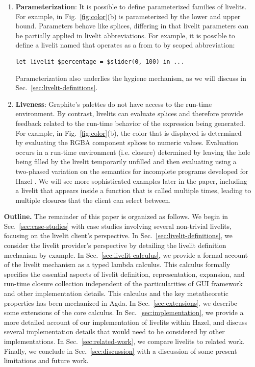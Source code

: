 \begin{enumerate}
  \item \textbf{Parameterization}: It is possible to define parameterized families of livelits.
  For example,  in Fig.~\ref{fig:color}(b) is parameterized by the lower and upper bound.
  Parameters behave like splices, differing in that livelit parameters can be partially applied in
  livelit abbreviations. For example, it is possible to define a livelit named 
  that operates as a  from  to  by scoped abbreviation:
  \begin{lstlisting}[numbers=none]
  let livelit $percentage = $slider(0, 100) in ...
  \end{lstlisting}
  Parameterization also underlies the hygiene mechanism, as we will discuss in Sec.~\ref{sec:livelit-definitions}.

  \item \textbf{Liveness}: Graphite's palettes do not have
  access to the run-time environment. By contrast, livelits can evaluate splices
  and therefore provide feedback related to the run-time behavior of the expression being generated.
  For example, in Fig.~\ref{fig:color}(b), the color that is displayed is determined by evaluating the RGBA
  component splices to numeric values.
  Evaluation occurs in a run-time environment (i.e. closure) determined by
  leaving the hole being filled by the livelit temporarily unfilled and then evaluating
  using a two-phased variation on the semantics for incomplete programs developed for Hazel \cite{HazelnutLive}.
  We will see more sophisticated examples later in the paper, including a livelit
  that appears inside a function that is called multiple times, leading to multiple closures that the client can
   select between.
\end{enumerate}

\noindent
\textbf{Outline.} The remainder of this paper is organized as follows. We begin in Sec.~\ref{sec:case-studies} with case studies
involving several non-trivial livelits, focusing on the livelit client's perspective.
In Sec.~\ref{sec:livelit-definitions}, we consider the livelit provider's perspective by detailing the livelit
definition mechanism by example.
In Sec.~\ref{sec:livelit-calculus}, we provide a formal account of the livelit mechanism as a typed lambda calculus.
This calculus formally specifies the essential aspects of livelit definition, representation, expansion,
and run-time closure collection independent of the particularities of GUI framework and other implementation details.
This calculus and the key metatheoretic properties has been mechanized in Agda.
In Sec.~\ref{sec:extensions}, we describe some extensions of the core calculus.
In Sec.~\ref{sec:implementation}, we provide a more detailed account of our implementation of livelits within Hazel,
and discuss several implementation details that would need to be considered by other implementations.
In Sec.~\ref{sec:related-work}, we compare livelits to related work.
Finally, we conclude in Sec.~\ref{sec:discussion} with a discussion of some present limitations and future work.